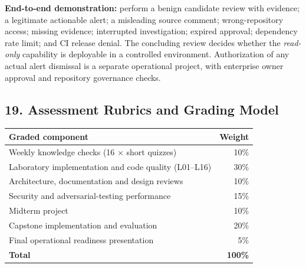 \documentclass[
  10pt,
]{article}
\begin{document}
\textbf{End-to-end demonstration:} perform a benign candidate review
with evidence; a legitimate actionable alert; a misleading source
comment; wrong-repository access; missing evidence; interrupted
investigation; expired approval; dependency rate limit; and CI release
denial. The concluding review decides whether the \emph{read-only}
capability is deployable in a controlled environment. Authorization of
any actual alert dismissal is a separate operational project, with
enterprise owner approval and repository governance checks.

\subsection{19. Assessment Rubrics and Grading
Model}\label{assessment-rubrics-and-grading-model}

\begin{longtable}[]{@{}lr@{}}
\toprule\noalign{}
Graded component & Weight \\
\midrule\noalign{}
\endhead
\bottomrule\noalign{}
\endlastfoot
Weekly knowledge checks (16 × short quizzes) & 10\% \\
Laboratory implementation and code quality (L01--L16) & 30\% \\
Architecture, documentation and design reviews & 10\% \\
Security and adversarial-testing performance & 15\% \\
Midterm project & 10\% \\
Capstone implementation and evaluation & 20\% \\
Final operational readiness presentation & 5\% \\
\textbf{Total} & \textbf{100\%} \\
\end{longtable}
\end{document}
